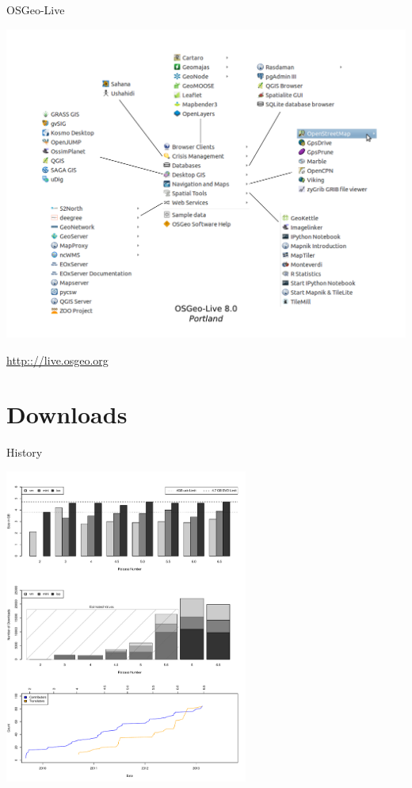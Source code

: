 \documentclass{beamer}
\newenvironment{reference}[2]{%
  \begin{textblock*}{\textwidth}(#1,#2) 
      \footnotesize\it\bgroup\color{black}}{\egroup\end{textblock*}}
\begin{document}
\begin{frame}{OSGeo-Live}
\begin{minipage}{\textwidth}
		\begin{center}
			\includegraphics[width=1.0\textwidth]{livemenu8.pdf}
		\end{center}
		\url{http:://live.osgeo.org}
	\end{minipage}
\end{frame}

\section{Downloads}

\begin{frame}{History}
\vspace{-.25in}
	\begin{minipage}{\textwidth}
		\begin{center}
			\includegraphics[width=0.6\textwidth]{OSGeoLiveInfographic.pdf}
		\end{center}
	\end{minipage}
\end{frame}
\end{document}
